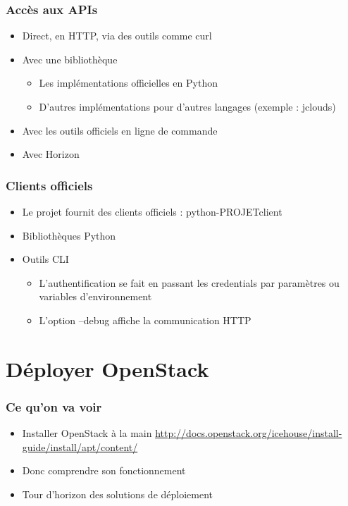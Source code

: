   \begin{frame}
    \frametitle{Accès aux APIs}
    \begin{itemize}
      \item Direct, en HTTP, via des outils comme curl
      \item Avec une bibliothèque
      \begin{itemize}
        \item Les implémentations officielles en Python
        \item D'autres implémentations pour d'autres langages (exemple : jclouds)
      \end{itemize}
      \item Avec les outils officiels en ligne de commande
      \item Avec Horizon
    \end{itemize}
  \end{frame}

  \begin{frame}
    \frametitle{Clients officiels}
    \begin{itemize}
      \item Le projet fournit des clients officiels : python-PROJETclient
      \item Bibliothèques Python
      \item Outils CLI
      \begin{itemize}
        \item L'authentification se fait en passant les credentials par paramètres ou variables d'environnement
        \item L'option --debug affiche la communication HTTP
      \end{itemize}
    \end{itemize}
  \end{frame}

  \section{Déployer OpenStack}

  \begin{frame}
    \frametitle{Ce qu'on va voir}
    \begin{itemize}
      \item Installer OpenStack à la main \url{http://docs.openstack.org/icehouse/install-guide/install/apt/content/}
      \item Donc comprendre son fonctionnement
      \item Tour d'horizon des solutions de déploiement
    \end{itemize}
  \end{frame}

